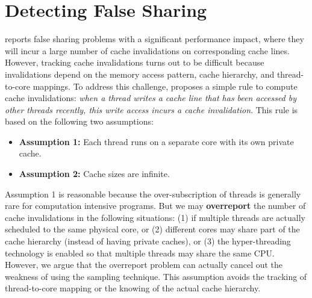 \section{Detecting False Sharing}
\label{sec:detect}

\cheetah{} reports false sharing problems with a significant performance impact, where they will incur a large number of cache invalidations on corresponding cache lines. However, tracking cache invalidations turns out to be difficult because invalidations depend on the memory access pattern, cache hierarchy, and thread-to-core mappings. 
To address this challenge, \cheetah{} proposes a simple rule to compute cache invalidations: \emph{when a thread writes a cache line that has been accessed by other threads recently, this write access incurs a cache invalidation}. This rule is based on the following two assumptions:
 

\begin{itemize} 
\item {\bf Assumption 1:} Each thread runs on a separate core with its own private cache. 

\item {\bf Assumption 2: } Cache sizes are infinite. 
 
\end{itemize}

Assumption 1 is reasonable because the over-subscription of threads is generally rare for computation intensive programs. But we may {\bf overreport} the number of cache invalidations in the following situations: (1) if multiple threads are actually scheduled to the same physical core, or (2) different cores may share part of the cache hierarchy (instead of having private caches), or (3) the hyper-threading technology is enabled so that multiple threads may share the same CPU. However, we argue that the overreport problem can actually cancel out the weakness of using the sampling technique. 
This assumption avoids the tracking of thread-to-core mapping or the knowing of the actual cache hierarchy.

